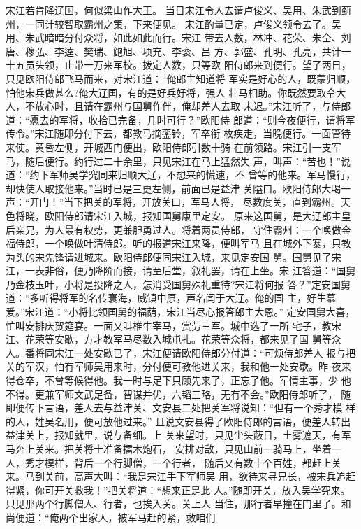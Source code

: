 宋江若肯降辽国，何似梁山作大王。
当日宋江令人去请卢俊义、吴用、朱武到蓟州，一同计较智取霸州之策，下来便见。
宋江酌量已定，卢俊义领令去了。吴用、朱武暗暗分付众将，如此如此而行。宋江
带去人数，林冲、花荣、朱仝、刘唐、穆弘、李逵、樊瑞、鲍旭、项充、李衮、吕
方、郭盛、孔明、孔亮，共计一十五员头领，止带一万来军校。拨定人数，只等欧
阳侍郎来到便行。望了两日，只见欧阳侍郎飞马而来，对宋江道：“俺郎主知道将
军实是好心的人，既蒙归顺，怕他宋兵做甚么?俺大辽国，有的是好兵好将，强人
壮马相助。你既然要取令大人，不放心时，且请在霸州与国舅作伴，俺却差人去取
未迟。”宋江听了，与侍郎道：“愿去的军将，收拾已完备，几时可行？”欧阳侍
郎道：“则今夜便行，请将军传令。”宋江随即分付下去，都教马摘銮铃，军卒衔
枚疾走，当晚便行。一面管待来使。黄昏左侧，开城西门便出，欧阳侍郎引数十骑
在前领路。宋江引一支军马，随后便行。约行过二十余里，只见宋江在马上猛然失
声，叫声：“苦也！”说道：“约下军师吴学究同来归顺大辽，不想来的慌速，不
曾等的他来。军马慢行，却快使人取接他来。”当时已是三更左侧，前面已是益津
关隘口。欧阳侍郎大喝一声：“开门！”当下把关的军将，开放关口，军马人将，
尽数度关，直到霸州。天色将晓，欧阳侍郎请宋江入城，报知国舅康里定安。
原来这国舅，是大辽郎主皇后亲兄，为人最有权势，更兼胆勇过人。将着两员侍郎，
守住霸州：一个唤做金福侍郎，一个唤做叶清侍郎。听的报道宋江来降，便叫军马
且在城外下寨，只教为头的宋先锋请进城来。欧阳侍郎便同宋江入城，来见定安国
舅。国舅见了宋江，一表非俗，便乃降阶而接，请至后堂，叙礼罢，请在上坐。宋
江答道：“国舅乃金枝玉叶，小将是投降之人，怎消受国舅殊礼重待?宋江将何报
答？”定安国舅道：“多听得将军的名传寰海，威镇中原，声名闻于大辽。俺的国
主，好生慕爱。”宋江道：“小将比领国舅的福荫，宋江当尽心报答郎主大恩。”
定安国舅大喜，忙叫安排庆贺筵宴。一面又叫椎牛宰马，赏劳三军。城中选了一所
宅子，教宋江、花荣等安歇，方才教军马尽数入城屯扎。花荣等众将，都来见了国
舅等众人。番将同宋江一处安歇已了，宋江便请欧阳侍郎分付道：“可烦侍郎差人
报与把关的军汉，怕有军师吴用来时，分付便可教他进关来，我和他一处安歇。昨
夜来得仓卒，不曾等候得他。我一时与足下只顾先来了，正忘了他。军情主事，少
他不得。更兼军师文武足备，智谋并优，六韬三略，无有不会。”欧阳侍郎听了，
随即便传下言语，差人去与益津关、文安县二处把关军将说知：“但有一个秀才模
样的人，姓吴名用，便可放他过来。”
且说文安县得了欧阳侍郎的言语，便差人转出益津关上，报知就里，说与备细。上
关来望时，只见尘头蔽日，土雾遮天，有军马奔上关来。把关将士准备擂木炮石，
安排对敌，只见山前一骑马上，坐着一人，秀才模样，背后一个行脚僧，一个行者，
随后又有数十个百姓，都赶上关来。马到关前，高声大叫：“我是宋江手下军师吴
用，欲待来寻兄长，被宋兵追赶得紧，你可开关救我！”把关将道：“想来正是此
人。”随即开关，放入吴学究来。只见那两个行脚僧人、行者，也挨入关。关上人
当住，那行者早撞在门里了。和尚便道：“俺两个出家人，被军马赶的紧，救咱们
